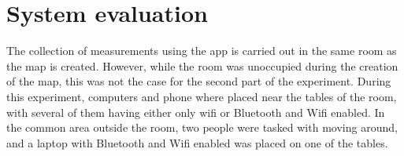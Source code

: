 \section{System evaluation}\label{sec:experiment_results}
The collection of measurements using the app is carried out in the same room as the map is created. 
However, while the room was unoccupied during the creation of the map, this was not the case for the 
second part of the experiment. 
During this experiment, computers and phone where placed near the tables of the room, with several of them having either only wifi or Bluetooth and Wifi enabled. 
In the common area outside the room, two people were tasked with moving around, and a laptop with Bluetooth and Wifi enabled was placed on one of the tables.
\begin{table}[H]
    \caption{Evaluation results from Samsung Galaxy A53 showing the number of correct classifications out of a possible ten for each k-value}
    \label{lst:resultsPhone}
\end{table}
